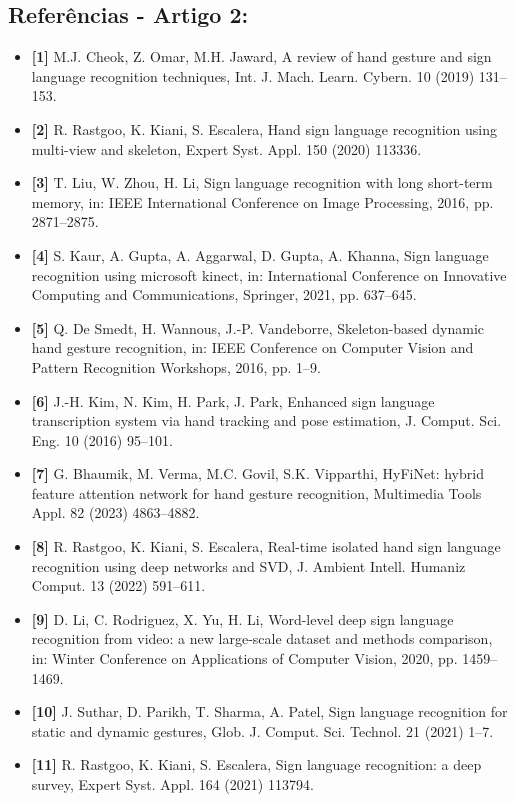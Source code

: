 \documentclass[12pt, a4paper]{article}
\begin{document}
\subsection{Referências - Artigo 2:}
\begin{itemize}[label=]
    \item \textbf{[1]} M.J. Cheok, Z. Omar, M.H. Jaward, A review of hand gesture and sign language recognition techniques, Int. J. Mach. Learn. Cybern. 10 (2019) 131–153.
    \item \textbf{[2]} R. Rastgoo, K. Kiani, S. Escalera, Hand sign language recognition using multi-view and skeleton, Expert Syst. Appl. 150 (2020) 113336.
    \item \textbf{[3]} T. Liu, W. Zhou, H. Li, Sign language recognition with long short-term memory, in: IEEE International Conference on Image Processing, 2016, pp. 2871–2875.
    \item \textbf{[4]} S. Kaur, A. Gupta, A. Aggarwal, D. Gupta, A. Khanna, Sign language recognition using microsoft kinect, in: International Conference on Innovative Computing and Communications, Springer, 2021, pp. 637–645.
    \item \textbf{[5]} Q. De Smedt, H. Wannous, J.-P. Vandeborre, Skeleton-based dynamic hand gesture recognition, in: IEEE Conference on Computer Vision and Pattern Recognition Workshops, 2016, pp. 1–9.
    \item \textbf{[6]} J.-H. Kim, N. Kim, H. Park, J. Park, Enhanced sign language transcription system via hand tracking and pose estimation, J. Comput. Sci. Eng. 10 (2016) 95–101.
    \item \textbf{[7]} G. Bhaumik, M. Verma, M.C. Govil, S.K. Vipparthi, HyFiNet: hybrid feature attention network for hand gesture recognition, Multimedia Tools Appl. 82 (2023) 4863–4882.
    \item \textbf{[8]} R. Rastgoo, K. Kiani, S. Escalera, Real-time isolated hand sign language recognition using deep networks and SVD, J. Ambient Intell. Humaniz Comput. 13 (2022) 591–611.
    \item \textbf{[9]} D. Li, C. Rodriguez, X. Yu, H. Li, Word-level deep sign language recognition from video: a new large-scale dataset and methods comparison, in: Winter Conference on Applications of Computer Vision, 2020, pp. 1459–1469.
    \item \textbf{[10]} J. Suthar, D. Parikh, T. Sharma, A. Patel, Sign language recognition for static and dynamic gestures, Glob. J. Comput. Sci. Technol. 21 (2021) 1–7.
    \item \textbf{[11]} R. Rastgoo, K. Kiani, S. Escalera, Sign language recognition: a deep survey, Expert Syst. Appl. 164 (2021) 113794.

\end{itemize}
\end{document}
